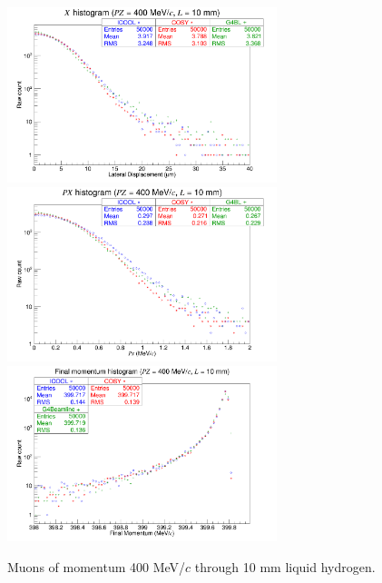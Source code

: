 \begin{figure}[H]
  \centering
    \includegraphics[width=0.7\textwidth]{Benchmarking/LH/X.400.10.png} 
    \includegraphics[width=0.7\textwidth]{Benchmarking/LH/PX.400.10.png} 
    \includegraphics[width=0.7\textwidth]{Benchmarking/LH/strag.400.10.png} 
  \caption{Muons of momentum 400 MeV/$c$ through 10 mm liquid hydrogen.}
  \label{fig:400.10}
\end{figure}

